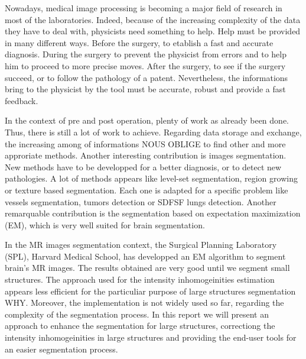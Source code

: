 Nowadays, medical image processing is becoming a major field of research in most of the laboratories. Indeed, because of the increasing complexity of the data they have to deal with,  physicists need something to help. Help must be provided in many different ways. Before the surgery, to etablish a fast and accurate diagnosis. During the surgery to prevent the physicist from errors and to help him to proceed to more precise moves. After the surgery, to see if the surgery succeed, or to follow the pathology of a patent. Nevertheless, the informations bring to the physicist by the tool must be accurate, robust and provide a fast feedback.
%
\par
%
In the context of pre and post operation, plenty of work as already been done. Thus, there is still a lot of work to achieve. Regarding data storage and exchange, the increasing among of informations NOUS OBLIGE to find other and more approriate methods. Another interesting contribution is images segmentation. New methods have to be developped for a better diagnosis, or to detect new pathologies. A lot of methods appears like level-set segmentation, region growing or texture based segmentation. Each one is adapted for a specific problem like vessels segmentation, tumors detection or SDFSF lungs detection. Another remarquable contribution is the segmentation based on expectation maximization (EM), which is very well suited for brain segmentation. 
%
\par
%
In the MR images segmentation context, the Surgical Planning Laboratory (SPL), Harvard Medical School, has developped an EM algorithm to segment brain's MR images. The results obtained are very good until we segment small structures. The approach used for the intensity inhomogeinities estimation appears less efficient for the particuliar purpose of large structures segmentation WHY. Moreover, the implementation is not widely used so far, regarding the complexity of the segmentation process. In this report we will present an approach to enhance the segmentation for large structures, correctiong the intensity inhomogeinities in large structures and providing the end-user tools for an easier segmentation process.
%
